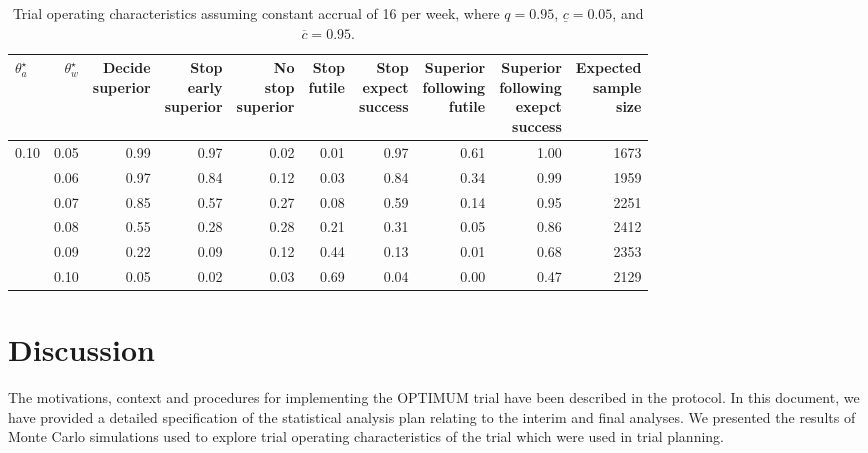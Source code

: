 \documentclass{bmcart}
\begin{document}
\begin{table}
	\caption{\label{tab:oc1}Trial operating characteristics assuming constant accrual of 16 per week, where $q=0.95$, $\underline{c}=0.05$, and $\overline{c}=0.95$.}
	\centering
	\begin{tabular}[t]{lrrrrrrrrr}
	\toprule
	$\theta_a^\star$ & $\theta_w^\star$ & \makecell{Decide\\superior} & \makecell{Stop\\early\\superior} & \makecell{No\\stop\\superior} & \makecell{Stop\\futile} & \makecell{Stop\\expect\\success} & \makecell{Superior\\following\\futile} & \makecell{Superior\\following\\exepct\\success} & \makecell{Expected\\sample\\size}\\
	\midrule
	0.10 & 0.05 & 0.99 & 0.97 & 0.02 & 0.01 & 0.97 & 0.61 & 1.00 & 1673\\
	 & 0.06 & 0.97 & 0.84 & 0.12 & 0.03 & 0.84 & 0.34 & 0.99 & 1959\\
	 & 0.07 & 0.85 & 0.57 & 0.27 & 0.08 & 0.59 & 0.14 & 0.95 & 2251\\
	 & 0.08 & 0.55 & 0.28 & 0.28 & 0.21 & 0.31 & 0.05 & 0.86 & 2412\\
	 & 0.09 & 0.22 & 0.09 & 0.12 & 0.44 & 0.13 & 0.01 & 0.68 & 2353\\
	 & 0.10 & 0.05 & 0.02 & 0.03 & 0.69 & 0.04 & 0.00 & 0.47 & 2129\\
	\bottomrule
	\end{tabular}
\end{table}



\section*{Discussion}

The motivations, context and procedures for implementing the OPTIMUM trial have been described in the protocol. 
In this document, we have provided a detailed specification of the statistical analysis plan relating to the interim and final analyses. 
We presented the results of Monte Carlo simulations used to explore trial operating characteristics of the trial which were used in trial planning.
\end{document}
